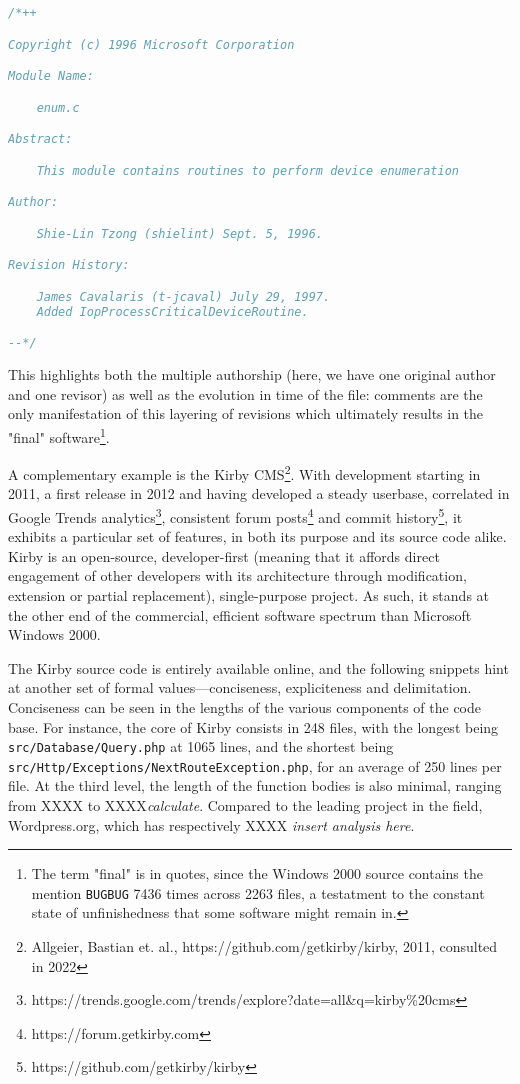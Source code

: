 \begin{lstlisting}[language=C, basicstyle=\small]
  /*++

Copyright (c) 1996 Microsoft Corporation

Module Name:

    enum.c

Abstract:

    This module contains routines to perform device enumeration

Author:

    Shie-Lin Tzong (shielint) Sept. 5, 1996.

Revision History:

    James Cavalaris (t-jcaval) July 29, 1997.
    Added IopProcessCriticalDeviceRoutine.

--*/
\end{lstlisting}

This highlights both the multiple authorship (here, we have one original author and one revisor) as well as the evolution in time of the file: comments are the only manifestation of this layering of revisions which ultimately results in the "final" software\footnote{The term "final" is in quotes, since the Windows 2000 source contains the mention \lstinline{BUGBUG} 7436 times across 2263 files, a testatment to the constant state of unfinishedness that some software might remain in.}.

A complementary example is the Kirby CMS\footnote{Allgeier, Bastian et. al., https://github.com/getkirby/kirby, 2011, consulted in 2022}. With development starting in 2011, a first release in 2012 and having developed a steady userbase, correlated in Google Trends analytics\footnote{https://trends.google.com/trends/explore?date=all\&q=kirby\%20cms}, consistent forum posts\footnote{https://forum.getkirby.com} and commit history\footnote{https://github.com/getkirby/kirby}, it exhibits a particular set of features, in both its purpose and its source code alike. Kirby is an open-source, developer-first (meaning that it affords direct engagement of other developers with its architecture through modification, extension or partial replacement), single-purpose project. As such, it stands at the other end of the commercial, efficient software spectrum than Microsoft Windows 2000.

The Kirby source code is entirely available online, and the following snippets hint at another set of formal values—conciseness, expliciteness and delimitation. Conciseness can be seen in the lengths of the various components of the code base. For instance, the core of Kirby consists in 248 files, with the longest being \lstinline{src/Database/Query.php} at 1065 lines, and the shortest being \lstinline{src/Http/Exceptions/NextRouteException.php}, for an average of 250 lines per file. At the third level, the length of the function bodies is also minimal, ranging from XXXX to XXXX\emph{calculate}. Compared to the leading project in the field, Wordpress.org, which has respectively XXXX \emph{insert analysis here}.

